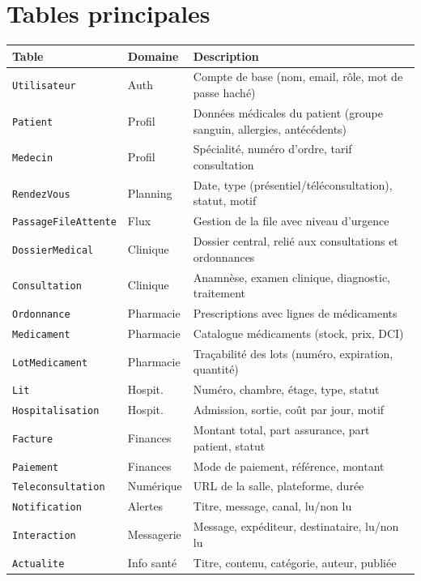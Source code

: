 \documentclass[12pt, a4paper]{report}
\begin{document}
\section{Tables principales}

\begin{longtable}{p{3.5cm} p{3cm} p{7cm}}
  \toprule
  \textbf{Table} & \textbf{Domaine} & \textbf{Description} \\
  \midrule
  \endhead
  \texttt{Utilisateur}     & Auth       & Compte de base (nom, email, rôle, mot de passe haché) \\
  \texttt{Patient}         & Profil     & Données médicales du patient (groupe sanguin, allergies, antécédents) \\
  \texttt{Medecin}         & Profil     & Spécialité, numéro d'ordre, tarif consultation \\
  \texttt{RendezVous}      & Planning   & Date, type (présentiel/téléconsultation), statut, motif \\
  \texttt{PassageFileAttente} & Flux    & Gestion de la file avec niveau d'urgence \\
  \texttt{DossierMedical}  & Clinique   & Dossier central, relié aux consultations et ordonnances \\
  \texttt{Consultation}    & Clinique   & Anamnèse, examen clinique, diagnostic, traitement \\
  \texttt{Ordonnance}      & Pharmacie  & Prescriptions avec lignes de médicaments \\
  \texttt{Medicament}      & Pharmacie  & Catalogue médicaments (stock, prix, DCI) \\
  \texttt{LotMedicament}   & Pharmacie  & Traçabilité des lots (numéro, expiration, quantité) \\
  \texttt{Lit}             & Hospit.    & Numéro, chambre, étage, type, statut \\
  \texttt{Hospitalisation} & Hospit.    & Admission, sortie, coût par jour, motif \\
  \texttt{Facture}         & Finances   & Montant total, part assurance, part patient, statut \\
  \texttt{Paiement}        & Finances   & Mode de paiement, référence, montant \\
  \texttt{Teleconsultation}& Numérique  & URL de la salle, plateforme, durée \\
  \texttt{Notification}    & Alertes    & Titre, message, canal, lu/non lu \\
  \texttt{Interaction}     & Messagerie & Message, expéditeur, destinataire, lu/non lu \\
  \texttt{Actualite}       & Info santé & Titre, contenu, catégorie, auteur, publiée \\
  \bottomrule
\end{longtable}
\end{document}
